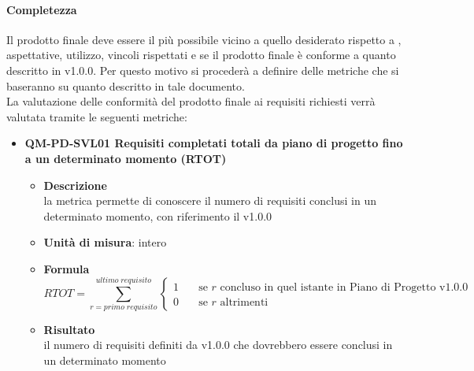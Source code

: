             \paragraph{Completezza}
                Il prodotto finale deve essere il più possibile vicino a quello desiderato rispetto a , aspettative, utilizzo, vincoli rispettati e se il prodotto finale è conforme a quanto descritto in  v1.0.0. Per questo motivo si procederà a definire delle metriche che si baseranno su quanto descritto in tale documento.\\
                La valutazione delle conformità del prodotto finale ai requisiti richiesti verrà valutata tramite le seguenti metriche:\\
                \begin{itemize}
                    \item\textbf{QM-PD-SVL01 Requisiti completati totali da piano di progetto fino a un determinato momento (RTOT)}
                        \begin{itemize}
                            \item\textbf{Descrizione}\\
                                la metrica permette di conoscere il numero di requisiti conclusi in un determinato momento, con riferimento il  v1.0.0\\
                            \item\textbf{Unità di misura}: intero
                            \item\textbf{Formula}\\
                                $$ \mathit{RTOT} = \sum_{r = \mathit{primo\;requisito}}^{\mathit{ultimo\;requisito}}
                                      \begin{cases}
                                            1       & \quad \text{se } r \text{ concluso in quel istante in Piano di Progetto v1.0.0}\\
                                            0  & \quad \text{se } r \text{ altrimenti}
                                      \end{cases}
                                $$
                            \item\textbf{Risultato}\\
                                il numero di requisiti definiti da  v1.0.0 che dovrebbero essere conclusi in un determinato momento
                                \newline

\end{itemize}
\end{itemize}
